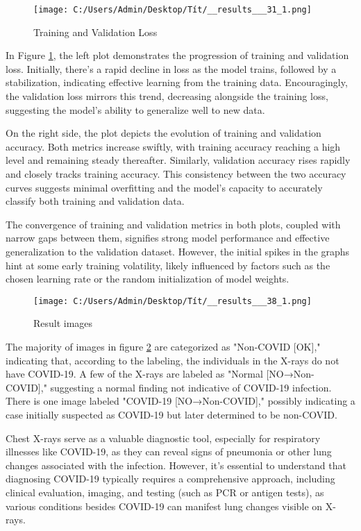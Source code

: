 \documentclass{article}
\begin{document}
\begin{figure}[htbp]
    \centering
    \texttt{[image: C:/Users/Admin/Desktop/Tít/\_\_results\_\_\_31\_1.png]}
    \caption{Training and Validation Loss}
    \label{fig:trainloss}
\end{figure}

In Figure \ref{fig:trainloss}, the left plot demonstrates the progression of training and validation loss. Initially, there's a rapid decline in loss as the model trains, followed by a stabilization, indicating effective learning from the training data. Encouragingly, the validation loss mirrors this trend, decreasing alongside the training loss, suggesting the model's ability to generalize well to new data.

On the right side, the plot depicts the evolution of training and validation accuracy. Both metrics increase swiftly, with training accuracy reaching a high level and remaining steady thereafter. Similarly, validation accuracy rises rapidly and closely tracks training accuracy. This consistency between the two accuracy curves suggests minimal overfitting and the model's capacity to accurately classify both training and validation data.

The convergence of training and validation metrics in both plots, coupled with narrow gaps between them, signifies strong model performance and effective generalization to the validation dataset. However, the initial spikes in the graphs hint at some early training volatility, likely influenced by factors such as the chosen learning rate or the random initialization of model weights.

\begin{figure}[htbp]
    \centering
    \texttt{[image: C:/Users/Admin/Desktop/Tít/\_\_results\_\_\_38\_1.png]}
    \caption{Result images}
    \label{fig:result}
\end{figure}

The majority of images in figure \ref{fig:result} are categorized as "Non-COVID [OK]," indicating that, according to the labeling, the individuals in the X-rays do not have COVID-19. A few of the X-rays are labeled as "Normal [NO→Non-COVID]," suggesting a normal finding not indicative of COVID-19 infection. There is one image labeled "COVID-19 [NO→Non-COVID]," possibly indicating a case initially suspected as COVID-19 but later determined to be non-COVID.

Chest X-rays serve as a valuable diagnostic tool, especially for respiratory illnesses like COVID-19, as they can reveal signs of pneumonia or other lung changes associated with the infection. However, it's essential to understand that diagnosing COVID-19 typically requires a comprehensive approach, including clinical evaluation, imaging, and testing (such as PCR or antigen tests), as various conditions besides COVID-19 can manifest lung changes visible on X-rays.
\end{document}
